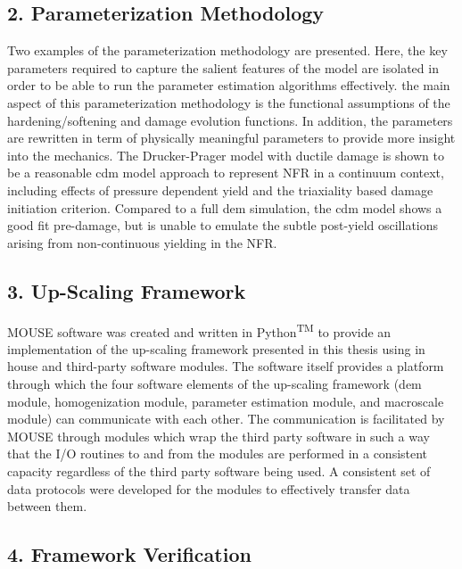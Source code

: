\subsection*{2. Parameterization Methodology}

Two examples of the parameterization methodology are presented. Here, the key parameters required to capture the salient features of the model are isolated in order to be able to run the parameter estimation algorithms effectively. the main aspect of this parameterization methodology is the functional assumptions of the hardening/softening and damage evolution functions. In addition, the parameters are rewritten in term of physically meaningful parameters to provide more insight into the mechanics. The Drucker-Prager model with ductile damage is shown to be a reasonable \acrshort{cdm} model approach to represent NFR in a continuum context, including effects of pressure dependent yield and the triaxiality based damage initiation criterion. Compared to a full \acrshort{dem} simulation, the \acrshort{cdm} model shows a good fit pre-damage, but is unable to emulate the subtle post-yield oscillations arising from non-continuous yielding in the NFR.

\subsection*{3. Up-Scaling Framework}

MOUSE software was created and written in Python\textsuperscript{TM} to provide an implementation of the up-scaling framework presented in this thesis using in house and third-party software modules. The software itself provides a platform through which the four software elements of the up-scaling framework (\acrshort{dem} module, homogenization module, parameter estimation module, and macroscale module) can communicate with each other. The communication is facilitated by MOUSE through modules which wrap the third party software in such a way that the I/O routines to and from the modules are performed in a consistent capacity regardless of the third party software being used. A consistent set of data protocols were developed for the modules to effectively transfer data between them.

\subsection*{4. Framework Verification}

